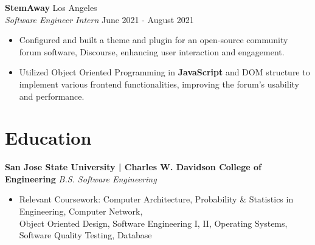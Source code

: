 \documentclass[a4paper,10pt]{article}
\begin{document}
\noindent \textbf{StemAway} \hfill {Los Angeles}\\
\textit{Software Engineer Intern} \hfill {June 2021 - August 2021}\vspace{-\baselineskip}
\vspace{2.5mm}
\begin{itemize}
    \item Configured and built a theme and plugin for an open-source community forum software, Discourse, enhancing user interaction and engagement.\vspace{0.3ex}
    \item Utilized Object Oriented Programming in \textbf{JavaScript} and DOM structure to implement various frontend functionalities, improving the forum’s usability and performance.\vspace{0.3ex}
\end{itemize}

\vspace{3mm}

\section*{Education}\vspace{0.5mm}
\noindent \textbf{San Jose State University | Charles W. Davidson College of Engineering} \hfill \textit{B.S. Software Engineering} \hfill 
\begin{itemize}
    \item Relevant Coursework: Computer Architecture, Probability \& Statistics in Engineering, Computer Network,\\Object Oriented Design, Software Engineering I, II, Operating Systems, Software Quality Testing, Database
\end{itemize}
\end{document}
